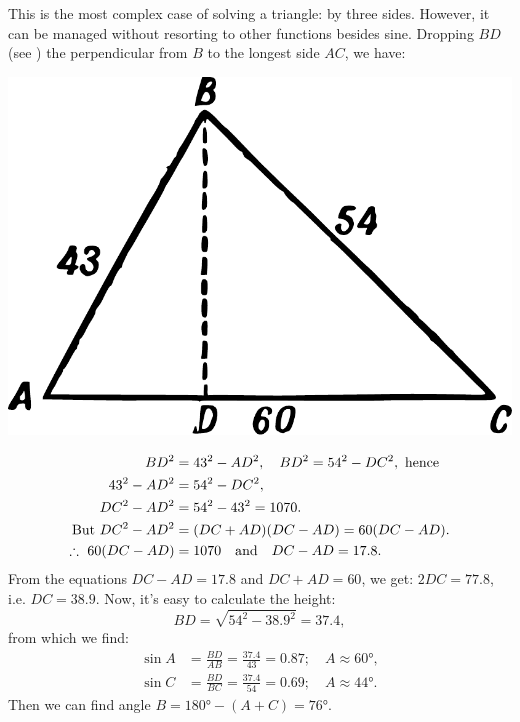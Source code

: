 \ans This is the most complex case of solving a triangle: by three sides. However, it can be managed without resorting to other functions besides sine. Dropping $BD$ (see ) the perpendicular from $B$ to the longest side $AC$, we have:
\begin{marginfigure}%
\centering
\includegraphics[width=\textwidth]{figures/ch-05/fig-096.pdf}
\end{marginfigure}
\begin{align*}%
BD^{2} & = 43^{2} - AD^{2}, \quad BD^{2} = 54^{2} - DC^{2},\,\, \text{hence}\\
43^{2} - AD^{2} & = 54^{2} - DC^{2},\\
DC^{2} - AD^{2} & = 54^{2} - 43^{2} = 1070.\\
\text{But} \,\,DC^{2} - AD^{2} & = (DC + AD)(DC - AD) = 60(DC - AD).  \\
\therefore \,\, 60(DC - AD) & = 1070 \qand DC - AD = 17.8. 
\end{align*}
From the equations $DC - AD = 17.8$ and $DC + AD = 60$, we get: 
$2DC = 77.8$, i.e. $DC = 38.9$. Now, it's easy to calculate the height:
\begin{equation*}%
BD = \sqrt{54^{2} - 38.9^{2}} = 37.4,
\end{equation*}
from which we find:
\begin{align*}%
\sin A & = \frac{BD}{AB} = \frac{37.4}{43} = 0.87; \quad A \approx \ang{60},\\
\sin C & = \frac{BD}{BC} = \frac{37.4}{54	} = 0.69; \quad A \approx \ang{44}.
\end{align*}
Then we can find angle $B = \ang{180} - (A + C) = \ang{76}$.

